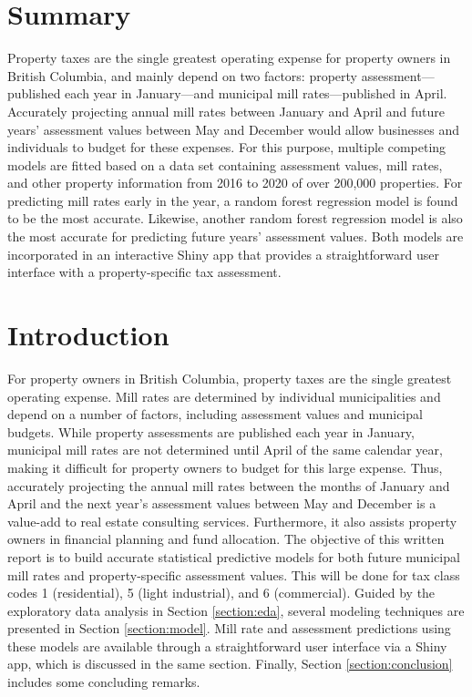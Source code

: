 \documentclass{article}
\begin{document}
\printtitle



\section*{Summary}
Property taxes are the single greatest operating expense for property owners in British Columbia, and mainly depend on two factors: property assessment---published each year in January---and municipal mill rates---published in April. Accurately projecting annual mill rates between January and April and future years' assessment values between May and December would allow businesses and individuals to budget for these expenses. For this purpose, multiple competing models are fitted based on a data set containing assessment values, mill rates, and other property information from 2016 to 2020 of over 200,000 properties. For predicting mill rates early in the year, a random forest regression model is found to be the most accurate. Likewise, another random forest regression model is also the most accurate for predicting future years' assessment values. Both models are incorporated in an interactive Shiny app that provides a straightforward user interface with a property-specific tax assessment.


\section{Introduction}
For property owners in British Columbia, property taxes are the single greatest operating expense. Mill rates are determined by individual municipalities and depend on a number of factors, including assessment values and municipal budgets.  While property assessments are published each year in January, municipal mill rates are not determined until April of the same calendar year, making it difficult for property owners to budget for this large expense.  Thus, accurately projecting the annual mill rates between the months of January and April and the next year's assessment values between May and December is a value-add to real estate consulting services. Furthermore, it also assists property owners in financial planning and fund allocation.  The objective of this written report is to build accurate statistical predictive models for both future municipal mill rates and property-specific assessment values. This will be done for tax class codes 1 (residential), 5 (light industrial), and 6 (commercial). Guided by the exploratory data analysis in Section \ref{section:eda}, several modeling techniques are presented in Section \ref{section:model}. Mill rate and assessment predictions using these models are available through a straightforward user interface via a Shiny app, which is discussed in the same section. Finally, Section \ref{section:conclusion} includes some concluding remarks.
\end{document}
